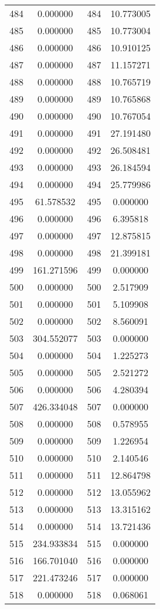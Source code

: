 \documentclass[12pt]{article}
\begin{document}
\begin{longtable}{@{}cccc@{}}
484 & 0.000000 & 484 & 10.773005 \\
485 & 0.000000 & 485 & 10.773004 \\
486 & 0.000000 & 486 & 10.910125 \\
487 & 0.000000 & 487 & 11.157271 \\
488 & 0.000000 & 488 & 10.765719 \\
489 & 0.000000 & 489 & 10.765868 \\
490 & 0.000000 & 490 & 10.767054 \\
491 & 0.000000 & 491 & 27.191480 \\
492 & 0.000000 & 492 & 26.508481 \\
493 & 0.000000 & 493 & 26.184594 \\
494 & 0.000000 & 494 & 25.779986 \\
495 & 61.578532 & 495 & 0.000000 \\
496 & 0.000000 & 496 & 6.395818 \\
497 & 0.000000 & 497 & 12.875815 \\
498 & 0.000000 & 498 & 21.399181 \\
499 & 161.271596 & 499 & 0.000000 \\
500 & 0.000000 & 500 & 2.517909 \\
501 & 0.000000 & 501 & 5.109908 \\
502 & 0.000000 & 502 & 8.560091 \\
503 & 304.552077 & 503 & 0.000000 \\
504 & 0.000000 & 504 & 1.225273 \\
505 & 0.000000 & 505 & 2.521272 \\
506 & 0.000000 & 506 & 4.280394 \\
507 & 426.334048 & 507 & 0.000000 \\
508 & 0.000000 & 508 & 0.578955 \\
509 & 0.000000 & 509 & 1.226954 \\
510 & 0.000000 & 510 & 2.140546 \\
511 & 0.000000 & 511 & 12.864798 \\
512 & 0.000000 & 512 & 13.055962 \\
513 & 0.000000 & 513 & 13.315162 \\
514 & 0.000000 & 514 & 13.721436 \\
515 & 234.933834 & 515 & 0.000000 \\
516 & 166.701040 & 516 & 0.000000 \\
517 & 221.473246 & 517 & 0.000000 \\
518 & 0.000000 & 518 & 0.068061 \\

\end{longtable}
\end{document}
